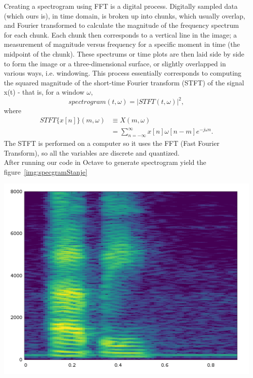 \documentclass[twoside]{article}
\newenvironment{Figure}
  {\par\medskip\noindent\minipage{\linewidth}}
  {\endminipage\par\medskip}
\begin{document}
\begin{multicols}{2}
Creating a spectrogram using FFT is a digital process. Digitally sampled data (which ours is), in time domain, is broken up into chunks, which usually overlap, and Fourier transformed to calculate the magnitude of the frequency spectrum for each chunk. Each chunk then corresponds to a vertical line in the image; a measurement of magnitude versus frequency for a specific moment in time (the midpoint of the chunk). These spectrums or time plots are then laid side by side to form the image or a three-dimensional surface, or slightly overlapped in various ways, i.e. windowing. This process essentially corresponds to computing the squared magnitude of the short-time Fourier transform (STFT) of the signal x(t) - that is, for a window $\omega$,
\[ spectrogram(t,\omega)=|STFT(t,\omega)|^2 ,\]
where 
\begin{align*} STFT \lbrace x[n] \rbrace (m,\omega)&\equiv X(m,\omega) \\ 
&=\sum_{n=-\infty}^{\infty} x[n]\omega [n-m]e^{-j\omega n}.
\end{align*}
The STFT is performed on a computer so it uses the FFT (Fast Fourier Transform), so all the variables are discrete and quantized. \\
After running our code in Octave to generate spectrogram yield the figure~\ref{img:specgramStanje} \\
\begin{Figure}
	\centering
	\includegraphics[width=1.0\textwidth]{happy-specgram}
	\label{img:specgramStanje}
\end{Figure}


\end{multicols}
\end{document}
